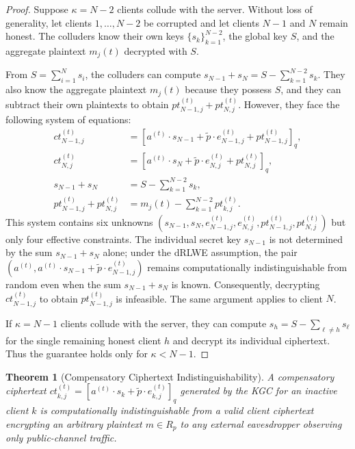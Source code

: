 \documentclass[10pt]{article}
\newtheorem{theorem}{Theorem}
\begin{document}
\begin{proof}
Suppose $\kappa=N-2$ clients collude with the server. Without loss of generality, let clients $1,\dots,N-2$ be corrupted and let clients $N-1$ and $N$ remain honest. The colluders know their own keys $\{s_k\}_{k=1}^{N-2}$, the global key $S$, and the aggregate plaintext $m_j(t)$ decrypted with $S$.

From $S=\sum_{i=1}^N s_i$, the colluders can compute $s_{N-1}+s_N=S-\sum_{k=1}^{N-2}s_k$. They also know the aggregate plaintext $m_j(t)$ because they possess $S$, and they can subtract their own plaintexts to obtain $pt_{N-1,j}^{(t)}+pt_{N,j}^{(t)}$. However, they face the following system of equations:
\begin{align*}
ct_{N-1,j}^{(t)}&=[a^{(t)}\cdot s_{N-1}+\tilde{p}\cdot e_{N-1,j}^{(t)}+pt_{N-1,j}^{(t)}]_q,\\
ct_{N,j}^{(t)}&=[a^{(t)}\cdot s_N+\tilde{p}\cdot e_{N,j}^{(t)}+pt_{N,j}^{(t)}]_q,\\
s_{N-1}+s_N&=S-\sum_{k=1}^{N-2}s_k,\\
pt_{N-1,j}^{(t)}+pt_{N,j}^{(t)}&=m_j(t)-\sum_{k=1}^{N-2}pt_{k,j}^{(t)}.
\end{align*}
This system contains six unknowns $(s_{N-1},s_N,e_{N-1,j}^{(t)},e_{N,j}^{(t)},pt_{N-1,j}^{(t)},pt_{N,j}^{(t)})$ but only four effective constraints. The individual secret key $s_{N-1}$ is not determined by the sum $s_{N-1}+s_N$ alone; under the dRLWE assumption, the pair $(a^{(t)},a^{(t)}\cdot s_{N-1}+\tilde{p}\cdot e_{N-1,j}^{(t)})$ remains computationally indistinguishable from random even when the sum $s_{N-1}+s_N$ is known. Consequently, decrypting $ct_{N-1,j}^{(t)}$ to obtain $pt_{N-1,j}^{(t)}$ is infeasible. The same argument applies to client $N$.

If $\kappa=N-1$ clients collude with the server, they can compute $s_h=S-\sum_{\ell\neq h}s_\ell$ for the single remaining honest client $h$ and decrypt its individual ciphertext. Thus the guarantee holds only for $\kappa<N-1$.
\end{proof}

\begin{theorem}[Compensatory Ciphertext Indistinguishability]
A compensatory ciphertext $ct_{k,j}^{(t)}=[a^{(t)}\cdot s_k+\tilde{p}\cdot e_{k,j}^{(t)}]_q$ generated by the KGC for an inactive client $k$ is computationally indistinguishable from a valid client ciphertext encrypting an arbitrary plaintext $m\in R_p$ to any external eavesdropper observing only public-channel traffic.
\end{theorem}
\end{document}
